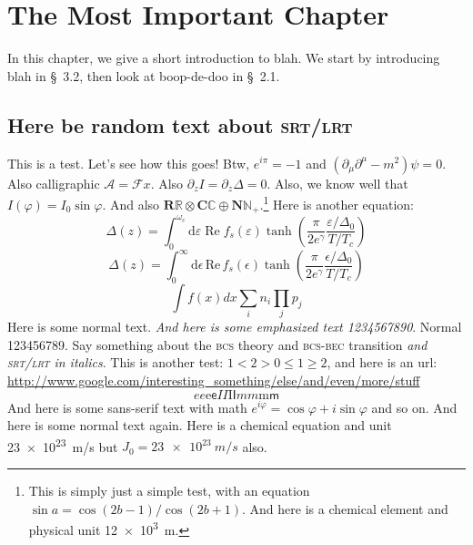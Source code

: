 \chapter{The Most Important Chapter}\noindent
In this chapter, we give a short introduction to blah.
We start by introducing blah in \S~3.2, then look at boop-de-doo in \S~2.1.

\section{Here be random text about \textsc{srt/lrt}}
This is a test. Let's see how this goes! Btw, $e^{i\pi} = -1$ and $(\partial_\mu \partial^\mu - m^2) \psi = 0$.
Also calligraphic $\mathcal{A} = \mathcal{F}x$.
Also $\partial_z I = \partial_z \Delta = 0$.
Also, we know well that $I(\varphi) = I_0 \sin \varphi$.  And also $\mathbf{R}\mathbb{R} \otimes \mathbf{C}\mathbb{C} \oplus \mathbf{N}\mathbb{N}_+$.\footnote{This is simply just a simple test, with an equation $\sin a = \cos(2b-1)/\cos(2b+1)$. And here is a chemical element  and physical unit \SI{12e3}{m}. }%
Here is another equation:
\begin{equation}
  Δ(z) = \int_0^{ω_c} \mathrm{d}ε\;\mathrm{Re}\; f_s(ε) \tanh\!\left(\frac{π}{2e^γ} \frac{ε/Δ_0}{T/T_c}\right)
\end{equation}
\begin{equation}
  \Delta(z) = \int_0^{\infty} \mathrm{d}\epsilon\,\mathrm{Re}\, f_s(\epsilon) \tanh\!\left(\frac{\pi}{2e^\gamma} \frac{\epsilon/\Delta_0}{T/T_c}\right)
\end{equation}
\begin{equation}
  \int f(x) dx \sum_i n_i \prod_j p_j
\end{equation}
Here is some normal text. \textit{And here is some emphasized text 1234567890}. Normal 123456789. 
Say something about the \textsc{bcs} theory and \textsc{bcs-bec} transition \emph{and \textsc{srt/lrt} in italics}.
This is another test: $1 < 2 > 0 \leq 1 \geq 2$, and here is an url: \url{http://www.google.com/interesting_something/else/and/even/more/stuff}
\begin{equation}
  \textit{e}e\mathrm{e}\textsf{e}%
  \textit{I}I\mathrm{I}\textsf{I}%
  \textit{m}m\mathrm{m}\textsf{m}%
\end{equation}
\textsf{And here is some sans-serif text with math $e^{i\varphi}=\cos\varphi+i\sin\varphi$ and so on.} And here is some normal text again.
Here is a chemical equation  and unit \SI{23e23}{m/s} but $J_0 = \SI{23e23}{m/s}$ also.

